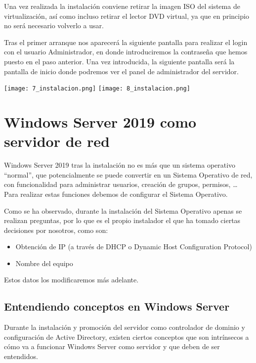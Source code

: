 Una vez realizada la instalación conviene retirar la imagen ISO del sistema de virtualización, así como incluso retirar el lector DVD virtual, ya que en principio no será necesario volverlo a usar.

Tras el primer arranque nos aparecerá la siguiente pantalla para realizar el login con el usuario Administrador, en donde introduciremos la contraseña que hemos puesto en el paso anterior. Una vez introducida, la siguiente pantalla será la pantalla de inicio donde podremos ver el panel de administrador del servidor.

\begin{tcolorbox}[title=Windows Server 2019 recién instalado,colback=white]
    \texttt{[image: 7\_instalacion.png]}
    \hfill
    \texttt{[image: 8\_instalacion.png]}
\end{tcolorbox}


\chapter{Windows Server 2019 como servidor de red}
Windows Server 2019 tras la instalación no es más que un sistema operativo “normal”, que potencialmente se puede convertir en un Sistema Operativo de red, con funcionalidad para administrar usuarios, creación de grupos, permisos, … Para realizar estas funciones debemos de configurar el Sistema Operativo.

Como se ha observado, durante la instalación del Sistema Operativo apenas se realizan preguntas, por lo que es el propio instalador el que ha tomado ciertas decisiones por nosotros, como son:

\begin{itemize}
    \item Obtención de IP (a través de DHCP o Dynamic Host Configuration Protocol)
    \item Nombre del equipo
\end{itemize}

Estos datos los modificaremos más adelante.


\section{Entendiendo conceptos en Windows Server}
Durante la instalación y promoción del servidor como controlador de dominio y configuración de Active Directory, existen ciertos conceptos que son intrínsecos a cómo va a funcionar Windows Server como servidor  y que deben de ser entendidos.


